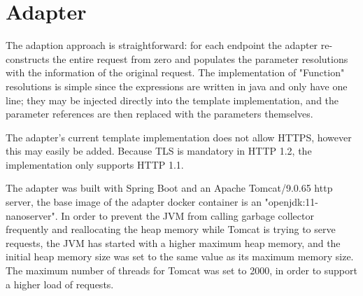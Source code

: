 \section{Adapter} %
\label{sec:adapter}

The adaption approach is straightforward: for each endpoint the
adapter re-constructs the entire request from zero and populates the parameter resolutions with the information of the original request.
The implementation of "Function" resolutions is simple since the expressions are written in java and only have one line;
they may be injected directly into the template implementation, and the parameter references are then replaced with the parameters themselves.

The adapter's current template implementation does not allow HTTPS, however this may easily be added.
Because TLS is mandatory in HTTP 1.2, the implementation only supports HTTP 1.1.

The adapter was built with Spring Boot and an Apache Tomcat/9.0.65 http server, the base image of the adapter docker container is an "openjdk:11-nanoserver".
In order to prevent the JVM from calling garbage collector frequently and reallocating the heap memory while Tomcat is trying to serve requests,
the JVM has started with a higher maximum heap memory, and the initial heap memory
size was set to the same value as its maximum memory size.
The maximum number of threads for Tomcat was set to 2000, in order to support a higher load of requests.


